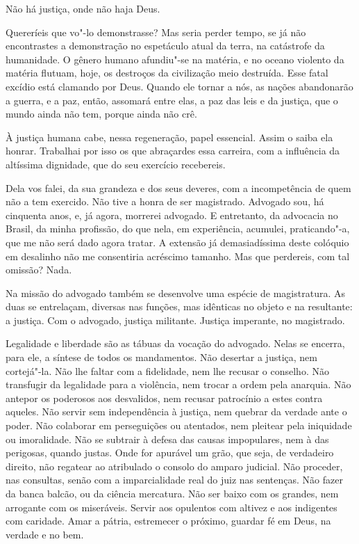 Não há justiça, onde não haja Deus.

Quereríeis que vo"-lo demonstrasse? Mas seria perder tempo, se já
não encontrastes a demonstração no espetáculo atual da terra, na
catástrofe da humanidade. O gênero humano afundiu"-se na matéria, e no
oceano violento da matéria flutuam, hoje, os destroços da civilização
meio destruída. Esse fatal excídio está clamando por Deus. Quando ele
tornar a nós, as nações abandonarão a guerra, e a paz, então, assomará
entre elas, a paz das leis e da justiça, que o mundo ainda não tem,
porque ainda não crê.

À justiça humana cabe, nessa regeneração, papel essencial. Assim o
saiba ela honrar. Trabalhai por isso os que abraçardes essa carreira,
com a influência da altíssima dignidade, que do seu exercício
recebereis.

Dela vos falei, da sua grandeza e dos seus deveres, com a
incompetência de quem não a tem exercido. Não tive a honra de ser
magistrado. Advogado sou, há cinquenta anos, e, já agora, morrerei
advogado. E entretanto, da advocacia no Brasil, da minha
profissão, do que nela, em experiência, acumulei, praticando"-a, que me
não será dado agora tratar. A extensão já demasiadíssima deste colóquio
em desalinho não me consentiria acréscimo tamanho. Mas que
perdereis, com tal omissão? Nada.

Na missão do advogado também se desenvolve uma espécie de
magistratura. As duas se entrelaçam, diversas nas funções, mas
idênticas no objeto e na resultante: a justiça. Com o advogado, justiça
militante. Justiça imperante, no magistrado.

Legalidade e liberdade são as tábuas da vocação do advogado. Nelas
se encerra, para ele, a síntese de todos os mandamentos. Não desertar a
justiça, nem cortejá"-la. Não lhe faltar com a fidelidade, nem lhe
recusar o conselho. Não transfugir da legalidade para a violência, nem
trocar a ordem pela anarquia. Não antepor os poderosos aos desvalidos,
nem recusar patrocínio a estes contra aqueles. Não servir sem
independência à justiça, nem quebrar da verdade ante o poder. Não
colaborar em perseguições ou atentados, nem pleitear pela iniquidade ou
imoralidade. Não se subtrair à defesa das causas impopulares, nem à das
perigosas, quando justas. Onde for apurável um grão, que seja, de
verdadeiro direito, não regatear ao atribulado o consolo do amparo
judicial. Não proceder, nas consultas, senão com a imparcialidade real
do juiz nas sentenças. Não fazer da banca balcão, ou da ciência
mercatura. Não ser baixo com os grandes, nem arrogante com os
miseráveis. Servir aos opulentos com altivez e aos indigentes com
caridade. Amar a pátria, estremecer o próximo, guardar fé em Deus, na
verdade e no bem.


